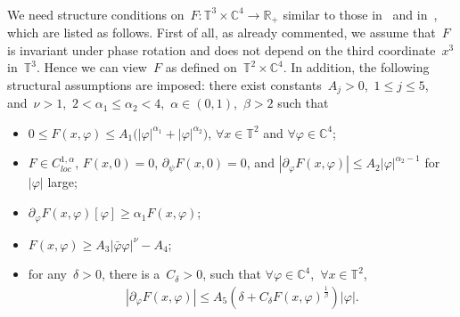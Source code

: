\documentclass[11pt,final]{amsart}
\newcommand{\p}{\partial}
\newcommand{\R}{\mathbb{R}}
\newcommand{\C}{\mathbb{C}}
\newcommand{\T}{\mathbb{T}}
\begin{document}
\ 

We need structure conditions on~$F\colon \T^3\times \C^4\to \R_+$ similar to those in~\cite{WZ2026Stationary} and in~\cite{EstebanSere1995stationary}, which are listed as follows. 
First of all, as already commented, we assume that~$F$ is invariant under phase rotation and does not depend on the third coordinate~$x^3$ in~$\T^3$.
Hence we can view~$F$ as defined on~$\T^2\times\C^4$. 
In addition, the following structural assumptions are imposed: there exist constants~$A_j>0$,~$1\leq j\leq 5$, and~$\nu>1$,~$2<\alpha_1\leq\alpha_2<4$,~$\alpha\in(0,1)$,~$\beta>2$ such that 
\begin{itemize}
    \item[(F1)] $ 0 \leq F(x,\varphi) \leq A_1 \big( |\varphi|^{\alpha_1} + |\varphi|^{\alpha_2} \big)$, $\forall x\in\T^2$ and $\forall \varphi \in \mathbb{C}^4 $;

    \item[(F2)] \( F \in C^{1,\alpha}_{loc} \), $F(x,0) =0 $, $\p_\psi F(x,0)=0$, and
          \( |\p_{\varphi} F(x,\varphi)| \leq A_2 |\varphi|^{\alpha_2 - 1} \) for \( |\varphi| \) large;

    \item[(F3)] \(  \p_\varphi F(x,\varphi)[\varphi]\geq \alpha_1 F(x,\varphi) \); 


    \item[(F4)] \( F(x,\varphi) \geq A_3 |\bar{\varphi}\varphi|^\nu - A_4 \);

    \item[(F5)] for any~$\delta > 0$, there is a~$C_\delta > 0$, such that $\forall \varphi \in \mathbb{C}^4$,~$\forall x\in\mathbb{T}^2$,
        \begin{align}
        |\p_\varphi F(x,\varphi)| 
        \leq A_5 \left( \delta + C_\delta F(x,\varphi)^{\frac{1}{\beta}} \right) |\varphi|.
        \end{align}
\end{itemize}
\end{document}
